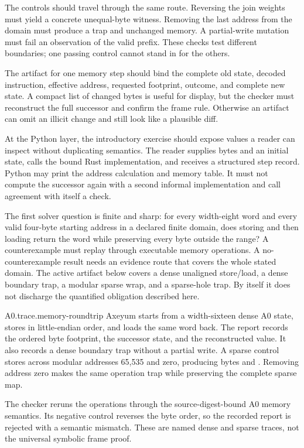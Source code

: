The controls should travel through the same route. Reversing the join weights
must yield a concrete unequal-byte witness. Removing the last address from the
domain must produce a trap and unchanged memory. A partial-write mutation must
fail an observation of the valid prefix. These checks test different
boundaries; one passing control cannot stand in for the others.

The artifact for one memory step should bind the complete old state, decoded
instruction, effective address, requested footprint, outcome, and complete new
state. A compact list of changed bytes is useful for display, but the checker
must reconstruct the full successor and confirm the frame rule. Otherwise an
artifact can omit an illicit change and still look like a plausible diff.

At the Python layer, the introductory exercise should expose values a reader
can inspect without duplicating semantics. The reader supplies bytes and an
initial state, calls the bound Rust implementation, and receives a structured
step record. Python may print the address calculation and memory table. It
must not compute the successor again with a second informal implementation and
call agreement with itself a check.

The first solver question is finite and sharp: for every width-eight
word and every valid four-byte starting address in a declared finite domain,
does storing and then loading return the word while preserving every byte
outside the range? A counterexample must replay through executable memory
operations. A no-counterexample result needs an evidence route that covers
the whole stated domain. The active artifact below covers a dense unaligned
store/load, a dense boundary trap, a modular sparse wrap, and a sparse-hole
trap. By itself it does not discharge the quantified obligation described here.

\begin{artifact}{A0.trace.memory-roundtrip}
Axeyum starts from a width-sixteen dense A0 state, stores  in
little-endian order, and loads the same word back. The report records the
ordered byte footprint, the successor state, and the reconstructed value. It
also records a dense boundary trap without a partial write. A sparse control
stores  across modular addresses 65,535 and zero, producing bytes
 and . Removing address zero makes the same operation trap
while preserving the complete sparse map.

The checker reruns the operations through the source-digest-bound A0 memory
semantics. Its negative control reverses the byte order, so the recorded report
is rejected with a semantic mismatch. These are named dense and sparse traces,
not the universal symbolic frame proof.
\end{artifact}

